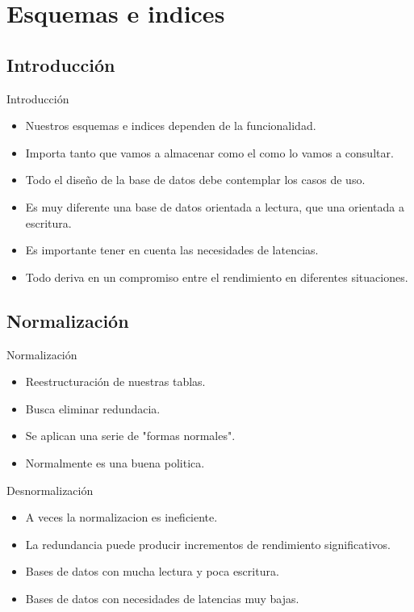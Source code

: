 \section{Esquemas e indices}

\subsection{Introducción}
\begin{frame}{Introducción}
  \begin{itemize}
    \item Nuestros esquemas e indices dependen de la funcionalidad.
    \item Importa tanto que vamos a almacenar como el como lo vamos a consultar.
    \item Todo el diseño de la base de datos debe contemplar los casos de uso.
    \item Es muy diferente una base de datos orientada a lectura, que una orientada a escritura.
    \item Es importante tener en cuenta las necesidades de latencias.
    \item Todo deriva en un compromiso entre el rendimiento en diferentes situaciones.
  \end{itemize}
\end{frame}

\subsection{Normalización}
\begin{frame}{Normalización}
  \begin{itemize}
    \item Reestructuración de nuestras tablas.
    \item Busca eliminar redundacia.
    \item Se aplican una serie de "formas normales".
    \item Normalmente es una buena politica.
  \end{itemize}
\end{frame}

\begin{frame}{Desnormalización}
  \begin{itemize}
    \item A veces la normalizacion es ineficiente.
    \item La redundancia puede producir incrementos de rendimiento significativos.
    \item Bases de datos con mucha lectura y poca escritura.
    \item Bases de datos con necesidades de latencias muy bajas.
  \end{itemize}
\end{frame}

